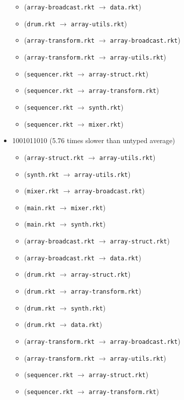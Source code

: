 \documentclass{article}
\newcommand{\mono}[1]{\texttt{#1}}
\begin{document}
\begin{itemize}
\begin{itemize}
  \item (\mono{array-broadcast.rkt} $\rightarrow$ \mono{data.rkt})
  \item (\mono{drum.rkt} $\rightarrow$ \mono{array-utils.rkt})
  \item (\mono{array-transform.rkt} $\rightarrow$ \mono{array-broadcast.rkt})
  \item (\mono{array-transform.rkt} $\rightarrow$ \mono{array-utils.rkt})
  \item (\mono{sequencer.rkt} $\rightarrow$ \mono{array-struct.rkt})
  \item (\mono{sequencer.rkt} $\rightarrow$ \mono{array-transform.rkt})
  \item (\mono{sequencer.rkt} $\rightarrow$ \mono{synth.rkt})
  \item (\mono{sequencer.rkt} $\rightarrow$ \mono{mixer.rkt})
  \end{itemize}
\item 1001011010 (5.76 times slower than untyped average)
  \begin{itemize}
  \item (\mono{array-struct.rkt} $\rightarrow$ \mono{array-utils.rkt})
  \item (\mono{synth.rkt} $\rightarrow$ \mono{array-utils.rkt})
  \item (\mono{mixer.rkt} $\rightarrow$ \mono{array-broadcast.rkt})
  \item (\mono{main.rkt} $\rightarrow$ \mono{mixer.rkt})
  \item (\mono{main.rkt} $\rightarrow$ \mono{synth.rkt})
  \item (\mono{array-broadcast.rkt} $\rightarrow$ \mono{array-struct.rkt})
  \item (\mono{array-broadcast.rkt} $\rightarrow$ \mono{data.rkt})
  \item (\mono{drum.rkt} $\rightarrow$ \mono{array-struct.rkt})
  \item (\mono{drum.rkt} $\rightarrow$ \mono{array-transform.rkt})
  \item (\mono{drum.rkt} $\rightarrow$ \mono{synth.rkt})
  \item (\mono{drum.rkt} $\rightarrow$ \mono{data.rkt})
  \item (\mono{array-transform.rkt} $\rightarrow$ \mono{array-broadcast.rkt})
  \item (\mono{array-transform.rkt} $\rightarrow$ \mono{array-utils.rkt})
  \item (\mono{sequencer.rkt} $\rightarrow$ \mono{array-struct.rkt})
  \item (\mono{sequencer.rkt} $\rightarrow$ \mono{array-transform.rkt})

\end{itemize}
\end{itemize}
\end{document}

